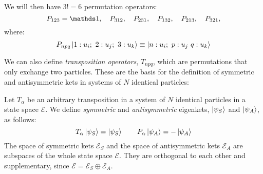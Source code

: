 We will then have $3! = 6$ permutation operators:
\begin{equation}
    P_{123} = \Imat,\quad P_{312}, \quad P_{231}, \quad P_{132}, \quad P_{213}, \quad P_{321},
\end{equation}
where:
\begin{equation}
    P_{npq}\ket{1:u_i;\ 2: u_j;\ 3: u_k} \equiv \ket{n:u_i;\ p: u_j\ q: u_k}
\end{equation}

We can also define \textit{transposition operators}, $T_{npq}$, which are permutations that only exchange two particles. These are the basis for the definition of symmetric and antisymmetric kets in systems of $N$ identical particles:

\begin{definition}
    Let $T_\alpha$ be an arbitrary transposition in a system of $N$ identical particles in a state space $\mathcal{E}$. We define \textit{symmetric} and \textit{antisymmetric} eigenkets, $\ket{\psi_S}$ and $\ket{\psi_A}$, as follows:
    \begin{equation}
        T_\alpha\ket{\psi_S} = \ket{\psi_S}\qquad P_\alpha\ket{\psi_A} = -\ket{\psi_A}
    \end{equation}
    The space of symmetric kets $\mathcal{E}_S$ and the space of antisymmetric kets $\mathcal{E}_A$ are subspaces of the whole state space $\mathcal{E}$. They are orthogonal to each other and supplementary, since $\mathcal{E} = \mathcal{E}_S \oplus \mathcal{E}_A$.
\end{definition}

